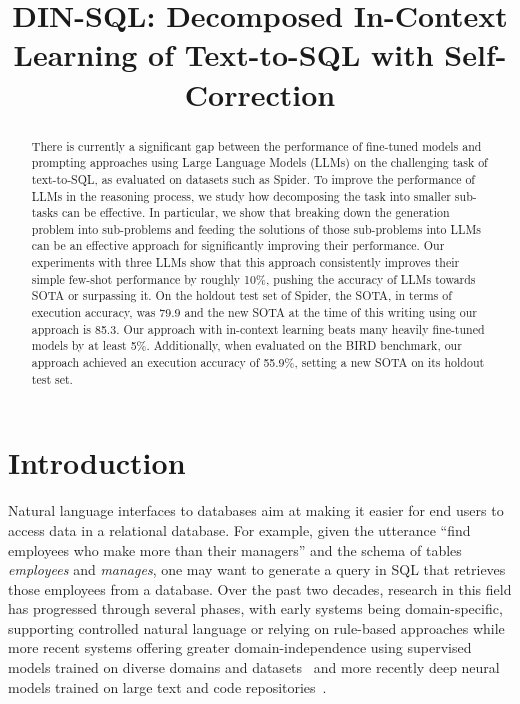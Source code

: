 \title{DIN-SQL: Decomposed In-Context Learning of Text-to-SQL with Self-Correction}



\maketitle

\begin{abstract}
  There is currently a significant gap between the performance of fine-tuned models and prompting approaches using Large Language Models (LLMs) on the challenging task of text-to-SQL, as evaluated on datasets such as Spider. To improve the performance of LLMs in the reasoning process, we study how decomposing the task into smaller sub-tasks can be effective. In particular, we show that breaking down the generation problem into sub-problems and feeding the solutions of those sub-problems into LLMs can be an effective approach for significantly improving their performance.
  Our experiments with three LLMs show that this approach consistently improves their simple few-shot performance by roughly 10\%, pushing the accuracy of LLMs towards SOTA or surpassing it.  
  On the holdout test set of Spider, the SOTA, in terms of execution accuracy, was 79.9 and the new SOTA at the time of  this writing using our approach is 85.3. Our approach with in-context learning beats many heavily fine-tuned models by at least 5\%. Additionally, when evaluated on the BIRD benchmark, our approach achieved an execution accuracy of 55.9\%, setting a new SOTA on its holdout test set.
\end{abstract}

\section{Introduction}

Natural language interfaces to databases aim at making it easier for end users to access data in a relational database. For example, given the utterance ``find employees who make more than their managers'' and the schema of tables \textit{employees} and \textit{manages}, one may want to generate a query in SQL that retrieves those employees from a database.
Over the past two decades, research in this field has progressed through several phases, with early systems being domain-specific, supporting controlled natural language \citep{popescu2003towards,popescu2004modern,li2007nalix,li2014constructing} or relying on rule-based approaches \citep{stratica2005using} 
while more recent systems offering greater domain-independence using supervised models trained on diverse domains and datasets~\citep{zhong2017seq2sql,yu2018spider} and more recently deep neural models trained on large text and code repositories~\citep{dong2016language,devlin2018bert}.

